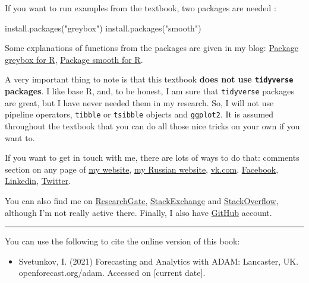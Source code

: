 \documentclass[
]{book}
\newenvironment{Shaded}{\begin{snugshade}}{\end{snugshade}}
\newcommand{\FunctionTok}[1]{\textcolor[rgb]{0.00,0.00,0.00}{#1}}
\newcommand{\NormalTok}[1]{#1}
\newcommand{\StringTok}[1]{\textcolor[rgb]{0.31,0.60,0.02}{#1}}
\providecommand{\tightlist}{%
  \setlength{\itemsep}{0pt}\setlength{\parskip}{0pt}}
\theoremstyle{definition}
\theoremstyle{definition}
\theoremstyle{definition}
\theoremstyle{definition}
\theoremstyle{remark}
\begin{document}
If you want to run examples from the textbook, two packages are needed \citep{R-greybox, R-smooth}:

\begin{Shaded}
\begin{Highlighting}[]
\FunctionTok{install.packages}\NormalTok{(}\StringTok{"greybox"}\NormalTok{)}
\FunctionTok{install.packages}\NormalTok{(}\StringTok{"smooth"}\NormalTok{)}
\end{Highlighting}
\end{Shaded}

Some explanations of functions from the packages are given in my blog: \href{https://forecasting.svetunkov.ru/en/category/r-en/greybox/}{Package greybox for R}, \href{https://forecasting.svetunkov.ru/en/category/r-en/smooth/}{Package smooth for R}.

A very important thing to note is that this textbook \textbf{does not use \texttt{tidyverse} packages}. I like base R, and, to be honest, I am sure that \texttt{tidyverse} packages are great, but I have never needed them in my research. So, I will not use pipeline operators, \texttt{tibble} or \texttt{tsibble} objects and \texttt{ggplot2}. It is assumed throughout the textbook that you can do all those nice tricks on your own if you want to.

If you want to get in touch with me, there are lots of ways to do that: comments section on any page of \href{https://forecasting.svetunkov.ru/}{my website}, \href{https://ivan.svetunkov.ru/}{my Russian website}, \href{https://vk.com/isvetunkov}{vk.com}, \href{https://www.facebook.com/isvetunkov}{Facebook}, \href{https://www.linkedin.com/in/isvetunkov}{Linkedin}, \href{https://twitter.com/iSvetunkov}{Twitter}.

You can also find me on \href{https://www.researchgate.net/profile/Ivan_Svetunkov}{ResearchGate}, \href{http://stats.stackexchange.com/users/87585/ivan-svetunkov}{StackExchange} and \href{http://stackoverflow.com/users/5296618/ivan-svetunkov}{StackOverflow}, although I'm not really active there. Finally, I also have \href{https://github.com/config-i1}{GitHub} account.

\begin{center}\rule{0.5\linewidth}{0.5pt}\end{center}

You can use the following to cite the online version of this book:

\begin{itemize}
\tightlist
\item
  Svetunkov, I. (2021) Forecasting and Analytics with ADAM: Lancaster, UK. openforecast.org/adam. Accessed on {[}current date{]}.
\end{itemize}
\end{document}
